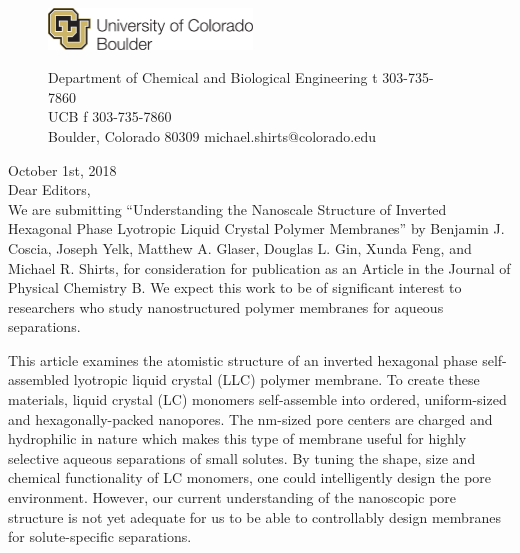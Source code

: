 \documentclass[fontsize=11pt]{article}
\begin{document}
	\graphicspath{{./figures/}}

	\begin{figure}
	\centering
	\begin{minipage}{0.37\textwidth}
	\includegraphics[width=2.14in,left]{CUBoulder.pdf}
	\end{minipage}
	\begin{minipage}{0.62\textwidth}
	\scriptsize
	\noindent Department of Chemical and Biological Engineering \hfill t 303-735-7860~~~~~~~~~~~~~~~~~~ \\
	 UCB \hfill f 303-735-7860~~~~~~~~~~~~~~~~~~ \\
	\noindent Boulder, Colorado 80309 \hfill michael.shirts@colorado.edu \\
	\end{minipage}
	\end{figure}
	
	\noindent October 1st, 2018\\

	\noindent Dear Editors,\\
	We are submitting ``Understanding the Nanoscale Structure of Inverted Hexagonal 
	Phase Lyotropic Liquid Crystal Polymer Membranes'' by Benjamin J. Coscia, Joseph Yelk, Matthew A. Glaser, Douglas
	L. Gin, Xunda Feng, and Michael R. Shirts, for
	consideration for publication as an Article in the Journal of Physical Chemistry
	B. We expect this work to be of significant interest to researchers who study 
	nanostructured polymer membranes for aqueous separations.
	
	This article examines the atomistic structure of an inverted hexagonal phase 
	self-assembled lyotropic liquid crystal (LLC) polymer membrane. To create these
	materials, liquid crystal (LC) monomers self-assemble into ordered, uniform-sized
	and hexagonally-packed nanopores. The nm-sized pore centers are charged and hydrophilic 
	in nature which makes this type of membrane useful for highly selective aqueous 
	separations of small solutes. By tuning the shape, size and chemical functionality
	of LC monomers, one could 
intelligently design the pore environment. However, our 
	current understanding of the nanoscopic pore structure is not yet adequate for us to
	be able to controllably design membranes for solute-specific separations.
	
\end{document}
